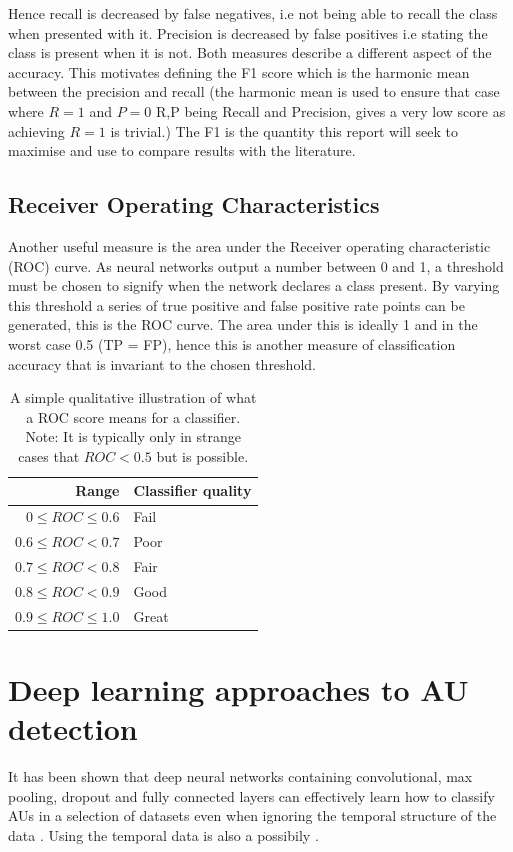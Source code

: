     Hence recall is decreased by false negatives, i.e not being able to recall the class
    when presented with it. Precision is decreased by false positives i.e stating the class
    is present when it is not. Both measures describe a different aspect of the accuracy. This
    motivates defining the F1 score which is the harmonic mean between the precision and recall
    (the harmonic mean is used to ensure that case where $R=1$ and $P=0$ R,P being Recall and Precision, gives
    a very low score  as achieving $R=1$ is trivial.) The F1 is the quantity this report will seek to maximise and use to compare
    results with the literature.
  \subsection{Receiver Operating Characteristics}
    Another useful measure is the area under the Receiver operating characteristic (ROC) curve.
    As neural networks output a number between 0 and 1, a threshold must be chosen to signify
    when the network declares a class present. By varying this threshold a series of true positive and false positive rate points
    can be generated, this is the ROC curve. The area under this is ideally 1 and in the worst case 0.5 (TP = FP), hence this is
    another measure of classification accuracy that is invariant to the chosen threshold.

    \begin{table}[]
      \centering \caption{A simple qualitative illustration of what a ROC score means for a classifier.
      Note: It is typically only in strange cases that $ROC< 0.5$ but is possible.} \label{my-label}
      \begin{tabular}{rl}
        \hline
        Range & Classifier quality \\ \hline
        $0 \leq ROC \leq 0.6$   & Fail               \\
        $0.6 \leq ROC    < 0.7$   & Poor               \\
        $0.7 \leq ROC    < 0.8$   & Fair               \\
        $0.8 \leq ROC    < 0.9$   & Good               \\
        $0.9 \leq ROC \leq 1.0$   & Great              \\ \hline
      \end{tabular}
  \end{table}
  \section{Deep learning approaches to AU detection}
    It has been shown that deep neural networks containing convolutional, max pooling,
    dropout and fully connected layers can effectively learn how to classify AUs in
    a selection of datasets even when ignoring the temporal structure of the data \cite{Gudi2015,Ghosh2015,Khorrami2015}.
    Using the temporal data is also a possibily \cite{emonet,Jaiswal2016}.
